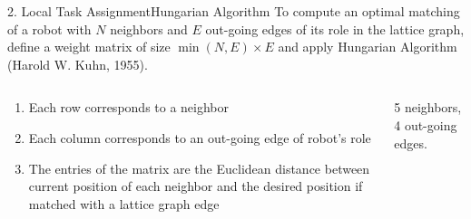 \begin{frame}{2. Local Task Assignment}{Hungarian Algorithm}
  To compute an optimal matching of a robot with $N$ neighbors and $E$
  out-going edges of its role in the lattice graph, define a weight
  matrix of size $\min(N,E) \times E$ and apply
  \textcolor{scred}{Hungarian Algorithm} (Harold W. Kuhn, 1955).
    \begin{columns}[T] %
      \begin{column}{.45\textwidth}
        \begin{enumerate}
        \item \small{Each row corresponds to a neighbor}
        \item \small{Each column corresponds to an out-going edge of robot's role}
        \item \small{The entries of the matrix are the Euclidean distance
          between current position of each neighbor and the desired
          position if matched with a lattice graph edge}
        \end{enumerate}
      \end{column}%
      \begin{column}{.45\textwidth}
        \vspace{3mm}
        
        \vspace{3mm}
        \begin{flushleft}
          \footnotesize{5 neighbors, 4 out-going edges.}
        \end{flushleft}
      \end{column}%
    \end{columns}
\end{frame}